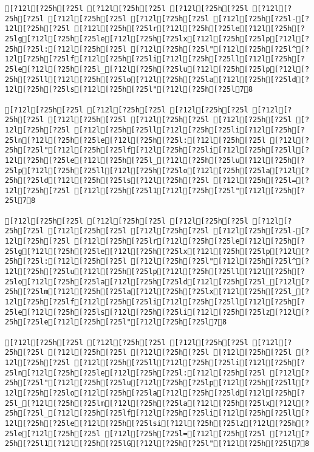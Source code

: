 \documentclass{scrartcl}
\begin{document}
\begin{Verbatim}
[?12l[?25h[?25l [?12l[?25h[?25l [?12l[?25h[?25l [?12l[?25h[?25l [?12l[?25h[?25l [?12l[?25h[?25l [?12l[?25h[?25l-[?12l[?25h[?25l [?12l[?25h[?25lr[?12l[?25h[?25le[?12l[?25h[?25lg[?12l[?25h[?25le[?12l[?25h[?25lx[?12l[?25h[?25lp[?12l[?25h[?25l:[?12l[?25h[?25l [?12l[?25h[?25l"[?12l[?25h[?25l^[?12l[?25h[?25lf[?12l[?25h[?25li[?12l[?25h[?25ll[?12l[?25h[?25le[?12l[?25h[?25l_[?12l[?25h[?25lu[?12l[?25h[?25lp[?12l[?25h[?25ll[?12l[?25h[?25lo[?12l[?25h[?25la[?12l[?25h[?25ld[?12l[?25h[?25ls[?12l[?25h[?25l"[?12l[?25h[?25l78

[?12l[?25h[?25l [?12l[?25h[?25l [?12l[?25h[?25l [?12l[?25h[?25l [?12l[?25h[?25l [?12l[?25h[?25l [?12l[?25h[?25l [?12l[?25h[?25l [?12l[?25h[?25ll[?12l[?25h[?25li[?12l[?25h[?25ln[?12l[?25h[?25le[?12l[?25h[?25l:[?12l[?25h[?25l [?12l[?25h[?25l"[?12l[?25h[?25lf[?12l[?25h[?25li[?12l[?25h[?25ll[?12l[?25h[?25le[?12l[?25h[?25l_[?12l[?25h[?25lu[?12l[?25h[?25lp[?12l[?25h[?25ll[?12l[?25h[?25lo[?12l[?25h[?25la[?12l[?25h[?25ld[?12l[?25h[?25ls[?12l[?25h[?25l [?12l[?25h[?25l=[?12l[?25h[?25l [?12l[?25h[?25l1[?12l[?25h[?25l"[?12l[?25h[?25l78

[?12l[?25h[?25l [?12l[?25h[?25l [?12l[?25h[?25l [?12l[?25h[?25l [?12l[?25h[?25l [?12l[?25h[?25l [?12l[?25h[?25l-[?12l[?25h[?25l [?12l[?25h[?25lr[?12l[?25h[?25le[?12l[?25h[?25lg[?12l[?25h[?25le[?12l[?25h[?25lx[?12l[?25h[?25lp[?12l[?25h[?25l:[?12l[?25h[?25l [?12l[?25h[?25l"[?12l[?25h[?25l^[?12l[?25h[?25lu[?12l[?25h[?25lp[?12l[?25h[?25ll[?12l[?25h[?25lo[?12l[?25h[?25la[?12l[?25h[?25ld[?12l[?25h[?25l_[?12l[?25h[?25lm[?12l[?25h[?25la[?12l[?25h[?25lx[?12l[?25h[?25l_[?12l[?25h[?25lf[?12l[?25h[?25li[?12l[?25h[?25ll[?12l[?25h[?25le[?12l[?25h[?25ls[?12l[?25h[?25li[?12l[?25h[?25lz[?12l[?25h[?25le[?12l[?25h[?25l"[?12l[?25h[?25l78

[?12l[?25h[?25l [?12l[?25h[?25l [?12l[?25h[?25l [?12l[?25h[?25l [?12l[?25h[?25l [?12l[?25h[?25l [?12l[?25h[?25l [?12l[?25h[?25l [?12l[?25h[?25ll[?12l[?25h[?25li[?12l[?25h[?25ln[?12l[?25h[?25le[?12l[?25h[?25l:[?12l[?25h[?25l [?12l[?25h[?25l"[?12l[?25h[?25lu[?12l[?25h[?25lp[?12l[?25h[?25ll[?12l[?25h[?25lo[?12l[?25h[?25la[?12l[?25h[?25ld[?12l[?25h[?25l_[?12l[?25h[?25lm[?12l[?25h[?25la[?12l[?25h[?25lx[?12l[?25h[?25l_[?12l[?25h[?25lf[?12l[?25h[?25li[?12l[?25h[?25ll[?12l[?25h[?25le[?12l[?25h[?25lsi[?12l[?25h[?25lz[?12l[?25h[?25le[?12l[?25h[?25l [?12l[?25h[?25l=[?12l[?25h[?25l [?12l[?25h[?25l1[?12l[?25h[?25lG[?12l[?25h[?25l"[?12l[?25h[?25l78


\end{Verbatim}
\end{document}
